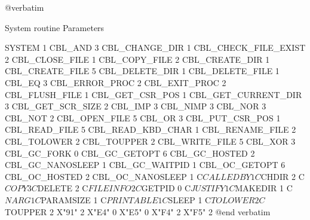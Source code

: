 @verbatim


System routine                  Parameters

SYSTEM                          1
CBL_AND                         3
CBL_CHANGE_DIR                  1
CBL_CHECK_FILE_EXIST            2
CBL_CLOSE_FILE                  1
CBL_COPY_FILE                   2
CBL_CREATE_DIR                  1
CBL_CREATE_FILE                 5
CBL_DELETE_DIR                  1
CBL_DELETE_FILE                 1
CBL_EQ                          3
CBL_ERROR_PROC                  2
CBL_EXIT_PROC                   2
CBL_FLUSH_FILE                  1
CBL_GET_CSR_POS                 1
CBL_GET_CURRENT_DIR             3
CBL_GET_SCR_SIZE                2
CBL_IMP                         3
CBL_NIMP                        3
CBL_NOR                         3
CBL_NOT                         2
CBL_OPEN_FILE                   5
CBL_OR                          3
CBL_PUT_CSR_POS                 1
CBL_READ_FILE                   5
CBL_READ_KBD_CHAR               1
CBL_RENAME_FILE                 2
CBL_TOLOWER                     2
CBL_TOUPPER                     2
CBL_WRITE_FILE                  5
CBL_XOR                         3
CBL_GC_FORK                     0
CBL_GC_GETOPT                   6
CBL_GC_HOSTED                   2
CBL_GC_NANOSLEEP                1
CBL_GC_WAITPID                  1
CBL_OC_GETOPT                   6
CBL_OC_HOSTED                   2
CBL_OC_NANOSLEEP                1
C$CALLEDBY                      1
C$CHDIR                         2
C$COPY                          3
C$DELETE                        2
C$FILEINFO                      2
C$GETPID                        0
C$JUSTIFY                       1
C$MAKEDIR                       1
C$NARG                          1
C$PARAMSIZE                     1
C$PRINTABLE                     1
C$SLEEP                         1
C$TOLOWER                       2
C$TOUPPER                       2
X"91"                           2
X"E4"                           0
X"E5"                           0
X"F4"                           2
X"F5"                           2
@end verbatim

